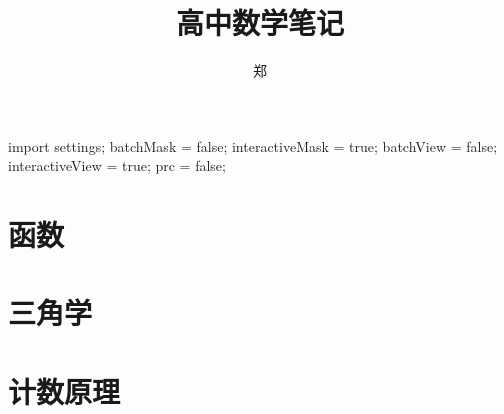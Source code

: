 \documentclass[a4paper, openany, UTF8]{ctexbook}
\title{{\Huge 高中数学笔记}}
\author{郑}
\begin{document}
	\begin{asydef}
		import settings;
		batchMask = false;
		interactiveMask = true;
		batchView = false;
		interactiveView = true;
		prc = false;
	\end{asydef}

	\frontmatter
	\setcounter{tocdepth}{1}
	\maketitle

	

	\tableofcontents
	\clearpage
	\mainmatter
	\raggedbottom

	\part{函数}
	

	\part{三角学}
	
	

	\part{计数原理}
	
	
\end{document}
